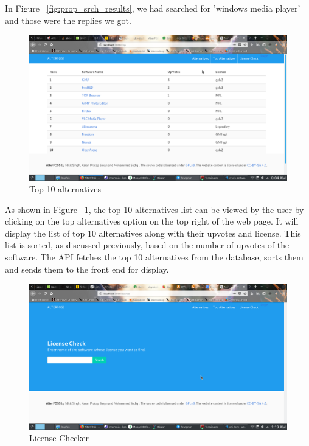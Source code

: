 In Figure ~\ref{fig:prop_srch_results}, we had searched for 'windows media player' and those were the replies we got.

\begin{figure}[h!]
\includegraphics[scale=0.43]{images/4-3.png}
\caption{Top 10 alternatives}
\label{fig:top_ten_alt}
\end{figure}

As shown in Figure ~\ref{fig:top_ten_alt}, the top 10 alternatives list can be viewed by the user by clicking on the top alternatives option on the top right of the web page. It will display the list of top 10 alternatives along with their upvotes and license. This list is sorted, as discussed previously, based on the number of upvotes of the software. The API fetches the top 10 alternatives from the database, sorts them and sends them to the front end for display.


\begin{figure}[h!]
\includegraphics[scale=0.44]{images/4-4.png}
\caption{License Checker}
\label{fig:license_chk}
\end{figure}

